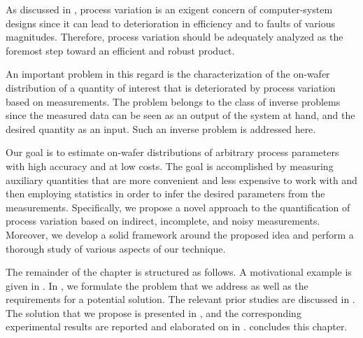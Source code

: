 As discussed in , process variation is an exigent
concern of computer-system designs since it can lead to deterioration in
efficiency and to faults of various magnitudes. Therefore, process variation
should be adequately analyzed as the foremost step toward an efficient and
robust product.

An important problem in this regard is the characterization of the on-wafer
distribution of a quantity of interest that is deteriorated by process variation
based on measurements. The problem belongs to the class of inverse problems
since the measured data can be seen as an output of the system at hand, and the
desired quantity as an input. Such an inverse problem is addressed here.

Our goal is to estimate on-wafer distributions of arbitrary process parameters
with high accuracy and at low costs. The goal is accomplished by measuring
auxiliary quantities that are more convenient and less expensive to work with
and then employing statistics in order to infer the desired parameters from the
measurements. Specifically, we propose a novel approach to the quantification of
process variation based on indirect, incomplete, and noisy measurements.
Moreover, we develop a solid framework around the proposed idea and perform a
thorough study of various aspects of our technique.

The remainder of the chapter is structured as follows. A motivational example is
given in . In , we formulate
the problem that we address as well as the requirements for a potential
solution. The relevant prior studies are discussed in .
The solution that we propose is presented in , and the
corresponding experimental results are reported and elaborated on in
.  concludes this chapter.
